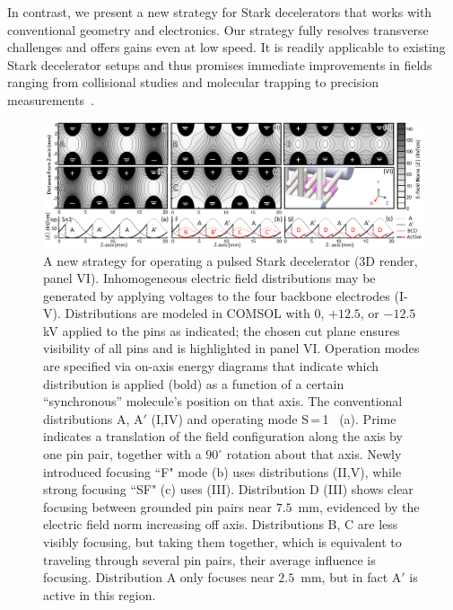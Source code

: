 \documentclass[%
 reprint,
 amsmath,amssymb,
 aps,
prl,
]{revtex4-1}
\begin{document}
In contrast, we present a new strategy for Stark decelerators that works with conventional geometry and electronics. 
Our strategy fully resolves transverse challenges and offers gains even at low speed.
It is readily applicable to existing Stark decelerator setups and thus promises immediate improvements in fields ranging from collisional studies and molecular trapping to precision measurements~\cite{Aggarwal2018}.

\begin{figure}[t!]
\includegraphics[width=\linewidth]{Fig1_new.png}%
\vspace{-2mm}
\caption{
A new strategy for operating a pulsed Stark decelerator (3D render, panel VI).
Inhomogeneous electric field distributions may be generated by applying voltages to the four backbone electrodes (I-V).
Distributions are modeled in COMSOL with $0$, $+12.5$, or $-12.5$ kV applied to the pins as indicated; the chosen cut plane ensures visibility of all pins and is highlighted in panel VI.
Operation modes are specified via on-axis energy diagrams that indicate which distribution is applied (bold) as a function of a certain ``synchronous'' molecule's position on that axis.
The conventional distributions A, A$'$ (I,IV) and operating mode S\,=\,1~\cite{VanDeMeerakker2005a} (a).
Prime indicates a translation of the field configuration along the axis by one pin pair, together with a $90^\circ$ rotation about that axis.%
Newly introduced focusing ``F" mode (b) uses distributions (II,V), while strong focusing ``SF" (c) uses (III).
Distribution D (III) shows clear focusing between grounded pin pairs near $7.5$~mm, evidenced by the electric field norm increasing off axis.
Distributions B, C are less visibly focusing, but taking them together, which is equivalent to traveling through several pin pairs, their average influence is focusing.
Distribution A only focuses near $2.5$~mm, but in fact A$'$ is active in this region.
\vspace{-4mm}
}
\label{fig:chargecartoon}
\end{figure}
\end{document}
